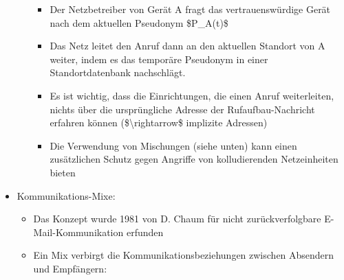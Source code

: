 \documentclass[a4paper]{article}
\begin{document}
\begin{multicols}{3}
\begin{itemize}
\begin{itemize}
                        \begin{itemize}
                            \item
                                  Der Netzbetreiber von Gerät A fragt das vertrauenswürdige Gerät
                                  nach dem aktuellen Pseudonym \$P\_A(t)\$
                            \item
                                  Das Netz leitet den Anruf dann an den aktuellen Standort von A
                                  weiter, indem es das temporäre Pseudonym in einer
                                  Standortdatenbank nachschlägt.
                            \item
                                  Es ist wichtig, dass die Einrichtungen, die einen Anruf
                                  weiterleiten, nichts über die ursprüngliche Adresse der
                                  Rufaufbau-Nachricht erfahren können (\$\textbackslash rightarrow\$
                                  implizite Adressen)
                            \item
                                  Die Verwendung von Mischungen (siehe unten) kann einen
                                  zusätzlichen Schutz gegen Angriffe von kolludierenden
                                  Netzeinheiten bieten
                        \end{itemize}
              \end{itemize}
        \item
              Kommunikations-Mixe:

              \begin{itemize}
                  \item
                        Das Konzept wurde 1981 von D. Chaum für nicht zurückverfolgbare
                        E-Mail-Kommunikation erfunden
                  \item
                        Ein Mix verbirgt die Kommunikationsbeziehungen zwischen Absendern
                        und Empfängern:


\end{itemize}
\end{itemize}
\end{multicols}
\end{document}
